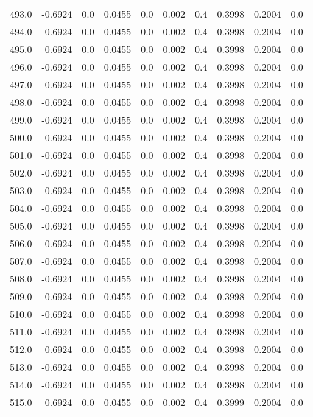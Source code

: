 \begin{longtable}{lrrrrrrrrr}
493.0 & -0.6924 & 0.0 & 0.0455 & 0.0 & 0.002 & 0.4 & 0.3998 & 0.2004 & 0.0 \\
494.0 & -0.6924 & 0.0 & 0.0455 & 0.0 & 0.002 & 0.4 & 0.3998 & 0.2004 & 0.0 \\
495.0 & -0.6924 & 0.0 & 0.0455 & 0.0 & 0.002 & 0.4 & 0.3998 & 0.2004 & 0.0 \\
496.0 & -0.6924 & 0.0 & 0.0455 & 0.0 & 0.002 & 0.4 & 0.3998 & 0.2004 & 0.0 \\
497.0 & -0.6924 & 0.0 & 0.0455 & 0.0 & 0.002 & 0.4 & 0.3998 & 0.2004 & 0.0 \\
498.0 & -0.6924 & 0.0 & 0.0455 & 0.0 & 0.002 & 0.4 & 0.3998 & 0.2004 & 0.0 \\
499.0 & -0.6924 & 0.0 & 0.0455 & 0.0 & 0.002 & 0.4 & 0.3998 & 0.2004 & 0.0 \\
500.0 & -0.6924 & 0.0 & 0.0455 & 0.0 & 0.002 & 0.4 & 0.3998 & 0.2004 & 0.0 \\
501.0 & -0.6924 & 0.0 & 0.0455 & 0.0 & 0.002 & 0.4 & 0.3998 & 0.2004 & 0.0 \\
502.0 & -0.6924 & 0.0 & 0.0455 & 0.0 & 0.002 & 0.4 & 0.3998 & 0.2004 & 0.0 \\
503.0 & -0.6924 & 0.0 & 0.0455 & 0.0 & 0.002 & 0.4 & 0.3998 & 0.2004 & 0.0 \\
504.0 & -0.6924 & 0.0 & 0.0455 & 0.0 & 0.002 & 0.4 & 0.3998 & 0.2004 & 0.0 \\
505.0 & -0.6924 & 0.0 & 0.0455 & 0.0 & 0.002 & 0.4 & 0.3998 & 0.2004 & 0.0 \\
506.0 & -0.6924 & 0.0 & 0.0455 & 0.0 & 0.002 & 0.4 & 0.3998 & 0.2004 & 0.0 \\
507.0 & -0.6924 & 0.0 & 0.0455 & 0.0 & 0.002 & 0.4 & 0.3998 & 0.2004 & 0.0 \\
508.0 & -0.6924 & 0.0 & 0.0455 & 0.0 & 0.002 & 0.4 & 0.3998 & 0.2004 & 0.0 \\
509.0 & -0.6924 & 0.0 & 0.0455 & 0.0 & 0.002 & 0.4 & 0.3998 & 0.2004 & 0.0 \\
510.0 & -0.6924 & 0.0 & 0.0455 & 0.0 & 0.002 & 0.4 & 0.3998 & 0.2004 & 0.0 \\
511.0 & -0.6924 & 0.0 & 0.0455 & 0.0 & 0.002 & 0.4 & 0.3998 & 0.2004 & 0.0 \\
512.0 & -0.6924 & 0.0 & 0.0455 & 0.0 & 0.002 & 0.4 & 0.3998 & 0.2004 & 0.0 \\
513.0 & -0.6924 & 0.0 & 0.0455 & 0.0 & 0.002 & 0.4 & 0.3998 & 0.2004 & 0.0 \\
514.0 & -0.6924 & 0.0 & 0.0455 & 0.0 & 0.002 & 0.4 & 0.3998 & 0.2004 & 0.0 \\
515.0 & -0.6924 & 0.0 & 0.0455 & 0.0 & 0.002 & 0.4 & 0.3999 & 0.2004 & 0.0 \\

\end{longtable}
